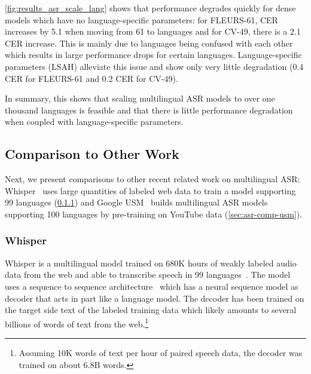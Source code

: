 \insertResultsASRLangScaling


\autoref{fig:results_asr_scale_lang} shows that performance degrades quickly for dense models which have no language-specific parameters:
for FLEURS-61, CER increases by 5.1 when moving from 61 to \nummmslang{} languages and for CV-49, there is a 2.1 CER increase.
This is mainly due to languages being confused with each other which results in large performance drops for certain languages.
Language-specific parameters (LSAH) alleviate this issue and show only very little degradation (0.4 CER for FLEURS-61 and 0.2 CER for CV-49).

In summary, this shows that scaling multilingual ASR models to over one thousand languages is feasible and that there is little performance degradation when coupled with language-specific parameters.



\subsection{Comparison to Other Work}
\label{sec:asr_main_results}

Next, we present comparisons to other recent related work on multilingual ASR: 
Whisper~\citep{radford2022whisper} uses large quantities of labeled web data to train a model supporting 99 languages (\textsection\ref{sec:asr-comp-whisper}) and Google USM~\citep{zhang2023usm} builds multilingual ASR models supporting 100 languages by pre-training on YouTube data (\textsection\ref{sec:asr-comp-usm}).

\subsubsection{Whisper}
\label{sec:asr-comp-whisper}

Whisper is a multilingual model trained on 680K hours of weakly labeled audio data from the web and able to transcribe speech in 99 languages~\citep{radford2022whisper}.
The model uses a sequence to sequence architecture~\citep{sutskever2014sequence} which has a neural sequence model as decoder that acts in part like a language model.
The decoder has been trained on the target side text of the labeled training data which likely amounts to several billions of words of text from the web.\footnote{Assuming 10K words of text per hour of paired speech data, the decoder was trained on about 6.8B words.}

\insertResultsASRWisper

